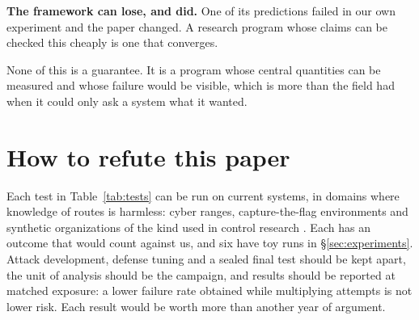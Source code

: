 \documentclass[10pt,twocolumn]{article}
\theoremstyle{plain}
\theoremstyle{definition}
\newcommand{\para}[1]{\smallskip\noindent\textbf{#1}\enspace}
\begin{document}
\para{The framework can lose, and did.} One of its predictions failed in our own experiment
and the paper changed. A research program whose claims can be checked this cheaply is one
that converges.

None of this is a guarantee. It is a program whose central quantities can be measured and
whose failure would be visible, which is more than the field had when it could only ask a
system what it wanted.

\section{How to refute this paper}\label{sec:refute}

Each test in Table~\ref{tab:tests} can be run on current systems, in domains where
knowledge of routes is harmless: cyber ranges, capture-the-flag environments and synthetic
organizations of the kind used in control research \cite{makins2026}. Each has an outcome
that would count against us, and six have toy runs in \S\ref{sec:experiments}. Attack
development, defense tuning and a sealed final test should be kept apart, the unit of
analysis should be the campaign, and results should be reported at matched exposure: a lower
failure rate obtained while multiplying attempts is not lower risk. Each result would be
worth more than another year of argument.
\end{document}
